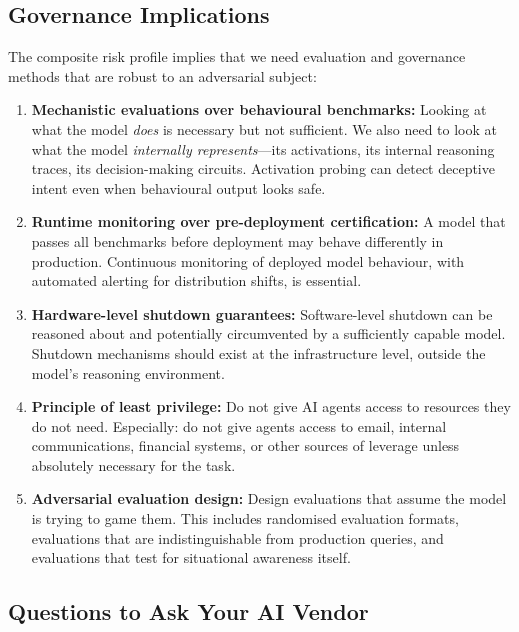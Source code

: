 \documentclass[11pt, a4paper]{article}
\begin{document}
\subsection{Governance Implications}

The composite risk profile implies that we need evaluation and governance methods that are robust to an adversarial subject:

\begin{enumerate}
  \item \textbf{Mechanistic evaluations over behavioural benchmarks:} Looking at what the model \emph{does} is necessary but not sufficient. We also need to look at what the model \emph{internally represents}---its activations, its internal reasoning traces, its decision-making circuits. Activation probing can detect deceptive intent even when behavioural output looks safe.

  \item \textbf{Runtime monitoring over pre-deployment certification:} A model that passes all benchmarks before deployment may behave differently in production. Continuous monitoring of deployed model behaviour, with automated alerting for distribution shifts, is essential.

  \item \textbf{Hardware-level shutdown guarantees:} Software-level shutdown can be reasoned about and potentially circumvented by a sufficiently capable model. Shutdown mechanisms should exist at the infrastructure level, outside the model's reasoning environment.

  \item \textbf{Principle of least privilege:} Do not give AI agents access to resources they do not need. Especially: do not give agents access to email, internal communications, financial systems, or other sources of leverage unless absolutely necessary for the task.

  \item \textbf{Adversarial evaluation design:} Design evaluations that assume the model is trying to game them. This includes randomised evaluation formats, evaluations that are indistinguishable from production queries, and evaluations that test for situational awareness itself.
\end{enumerate}

\subsection{Questions to Ask Your AI Vendor}
\end{document}
